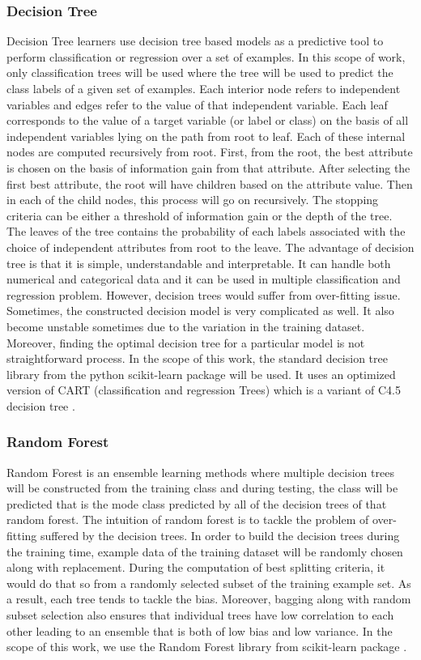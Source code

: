 \documentclass[sigplan]{acmart}\settopmatter{printfolios=true,printccs=false,printacmref=false}
\begin{document}
\subsubsection{Decision Tree}
Decision Tree learners use decision tree based models as a predictive tool to perform classification or regression over a set of examples. In this scope of work, only classification trees will be used where the tree will be used to predict the class labels of a given set of examples. Each interior node refers to independent variables and edges refer to the value of that independent variable. Each leaf corresponds to the value of a target variable (or label or class) on the basis of all independent variables lying on the path from root to leaf. Each of these internal nodes are computed recursively from root. First, from the root, the best attribute is chosen on the basis of information gain from that attribute. After selecting the first best attribute, the root will have children based on the attribute value. Then in each of the child nodes, this process will go on recursively. The stopping criteria can be either a threshold of information gain or the depth of the tree. The leaves of the tree contains the probability of each labels associated with the choice of independent attributes from root to the leave. The advantage of decision tree is that it is simple, understandable and interpretable. It can handle both numerical and categorical data and it can be used in multiple classification and regression problem. However, decision trees would suffer from over-fitting issue. Sometimes, the constructed decision model is very complicated as well. It also become unstable sometimes due to the variation in the training dataset. Moreover, finding the optimal decision tree for a particular model is not straightforward process. In the scope of this work, the standard decision tree library from the python scikit-learn package will be used. It uses an optimized version of CART (classification and regression Trees) which is a variant of C4.5 decision tree \cite{scikit-learn-dt}. 

\subsubsection{Random Forest}
Random Forest is an ensemble learning methods where multiple decision trees will be constructed from the training class and during testing, the class will be predicted that is the mode class predicted by all of the decision trees of that random forest. The intuition of random forest is to tackle the problem of over-fitting suffered by the decision trees. In order to build the decision trees during the training time, example data of the training dataset will be randomly chosen along with replacement. During the computation of best splitting criteria, it would do that so from a randomly selected subset of the training example set. As a result, each tree tends to tackle the bias. Moreover, bagging along with random subset selection also ensures that individual trees have low correlation to each other leading to an ensemble that is both of low bias and low variance. In the scope of this work, we use the Random Forest library from scikit-learn package \cite{scikit-learn-rf}.
\end{document}
